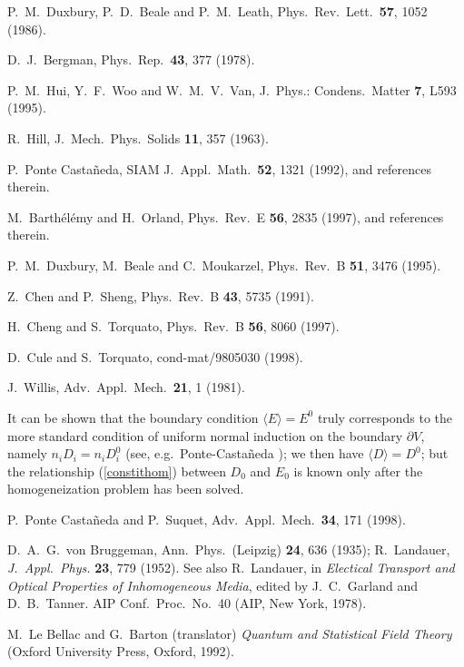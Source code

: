 \begin{thebibliography}{99}
 P.\ M.\ Duxbury, P.\ D.\ Beale and P.\ M.\ Leath,
Phys.\ Rev.\ Lett.\ {\bf 57}, 1052 (1986).

 D.\ J.\ Bergman, Phys.\ Rep.\ {\bf 43}, 377 (1978).

 P.\ M.\ Hui, Y.\ F.\ Woo and W.\ M.\ V.\ Van,
J.\ Phys.: Condens.\ Matter {\bf 7}, L593 (1995).

 R.\ Hill,
J.\ Mech.\ Phys.\ Solids {\bf 11}, 357 (1963).

 P.\ Ponte Casta\~{n}eda,
SIAM J.\ Appl.\ Math.\ {\bf 52}, 1321 (1992), and references therein.

 M.\ Barth\'{e}l\'{e}my and H.\ Orland,
Phys.\ Rev.\ E {\bf 56}, 2835 (1997), and references therein.

 P.\ M.\ Duxbury, M.\ Beale and C.\ Moukarzel,
Phys.\ Rev.\ B {\bf 51}, 3476 (1995).

 Z.\ Chen and P.\ Sheng,
Phys.\ Rev.\ B {\bf 43}, 5735 (1991).

 H.\ Cheng and S.\ Torquato,
Phys.\ Rev.\ B {\bf 56}, 8060 (1997).

 D.\ Cule and S.\ Torquato, cond-mat/9805030 (1998).

 J.\ Willis, Adv.\ Appl.\ Mech.\ {\bf 21}, 1 (1981).

 It can be shown that the boundary condition
$\langle{E}\rangle=E^0$ truly corresponds to the more
standard condition of uniform normal induction on the
boundary $\partial V$, namely $n_i D_i=n_i D^0_i$
(see, e.g.\ Ponte-Casta\~{n}eda \cite{PONT92b}); we then
have $\langle{D}\rangle=D^0$; but the relationship
(\ref{constithom}) between $D_0$ and $E_0$ is known
only after the homogeneization problem has been solved.

 P.\ Ponte Casta\~{n}eda and P.\ Suquet,
Adv.\ Appl.\ Mech.\ {\bf 34}, 171 (1998).

 D.\ A.\ G.\ von Bruggeman,
Ann.\ Phys.\ (Leipzig) {\bf 24}, 636 (1935);
R.~Landauer, {\it J.~Appl.~Phys.} {\bf 23}, 779 (1952).
See also R.~Landauer, in {\it Electical Transport and 
Optical Properties of 
Inhomogeneous Media}, edited by J.~C.~Garland and D.~B.~Tanner.
AIP Conf.~Proc.~No.\ 40 (AIP, New York, 1978).

 M.\ Le Bellac and G.\ Barton (translator)
{\em Quantum and Statistical Field Theory}
(Oxford University Press, Oxford, 1992).


\end{thebibliography}

